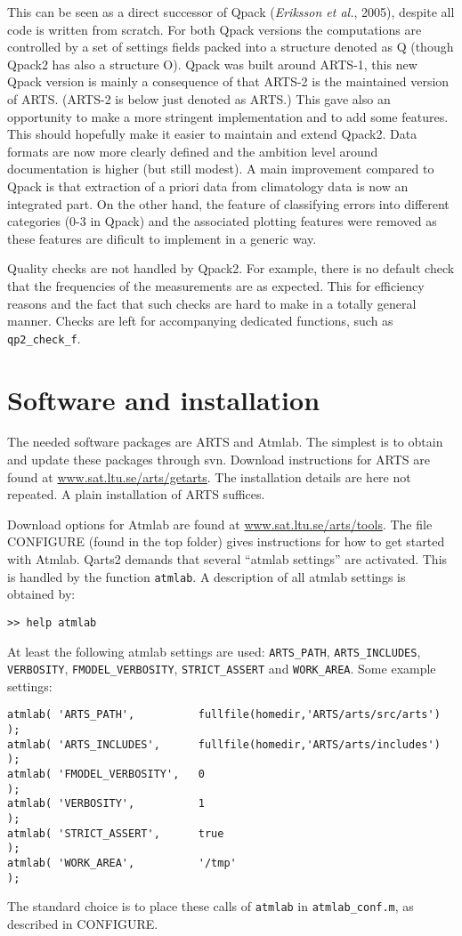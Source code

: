 \documentclass[a4paper,11pt]{article}
\begin{document}
This can be seen as a direct successor of Qpack ({\it Eriksson et al.}, 2005),
despite all code is written from scratch. For both Qpack versions the
computations are controlled by a set of settings fields packed into a structure
denoted as Q (though Qpack2 has also a structure O). Qpack was built around
ARTS-1, this new Qpack version is mainly a consequence of that ARTS-2 is the
maintained version of ARTS. (ARTS-2 is below just denoted as ARTS.) This gave
also an opportunity to make a more stringent implementation and to add some
features. This should hopefully make it easier to maintain and extend Qpack2.
Data formats are now more clearly defined and the ambition level around
documentation is higher (but still modest). A main improvement compared to
Qpack is that extraction of a priori data from climatology data is now an
integrated part. On the other hand, the feature of classifying errors into
different categories (0-3 in Qpack) and the associated plotting features were
removed as these features are dificult to implement in a generic way.

Quality checks are not handled by Qpack2. For example, there is no default
check that the frequencies of the measurements are as expected. This for
efficiency reasons and the fact that such checks are hard to make in a
totally general manner. Checks are left for accompanying dedicated
functions, such as \verb|qp2_check_f|.


\section{Software and installation}
\label{sec:download}
The needed software packages are ARTS and Atmlab. The simplest is to obtain
and update these packages through svn. Download instructions for ARTS are
found at \url{www.sat.ltu.se/arts/getarts}. The installation details are here
not repeated. A plain installation of ARTS suffices.

Download options for Atmlab are found at \url{www.sat.ltu.se/arts/tools}. The
file CONFIGURE (found in the top folder) gives instructions for how to get
started with Atmlab. Qarts2 demands that several ``atmlab settings'' are
activated. This is handled by the function \verb|atmlab|. A description of all
atmlab settings is obtained by:
\begin{verbatim}
>> help atmlab
\end{verbatim}
At least the following atmlab settings are used: \verb|ARTS_PATH|,
\verb|ARTS_INCLUDES|, \verb|VERBOSITY|, \verb|FMODEL_VERBOSITY|,
\verb|STRICT_ASSERT| and \verb|WORK_AREA|. Some example settings:
\begin{verbatim}
atmlab( 'ARTS_PATH',          fullfile(homedir,'ARTS/arts/src/arts') );
atmlab( 'ARTS_INCLUDES',      fullfile(homedir,'ARTS/arts/includes') );
atmlab( 'FMODEL_VERBOSITY',   0                                      ); 
atmlab( 'VERBOSITY',          1                                      );
atmlab( 'STRICT_ASSERT',      true                                   );
atmlab( 'WORK_AREA',          '/tmp'                                 );
\end{verbatim}
The standard choice is to place these calls of \verb|atmlab| in
\verb|atmlab_conf.m|, as described in CONFIGURE.
\end{document}
